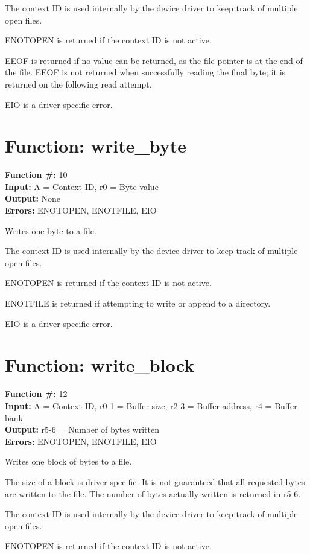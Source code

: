 The context ID is used internally by the device driver to keep
track of multiple open files.

ENOTOPEN is returned if the context ID is not active.

EEOF is returned if no value can be returned, as the file
pointer is at the end of the file. EEOF is not returned when
successfully reading the final byte; it is returned on
the following read attempt.

EIO is a driver-specific error.


\section{Function: write\_byte}

\textbf{Function \#:} 10 \\
\textbf{Input:} A = Context ID, r0 = Byte value \\
\textbf{Output:} None \\
\textbf{Errors:} ENOTOPEN, ENOTFILE, EIO

Writes one byte to a file.

The context ID is used internally by the device driver to keep
track of multiple open files.

ENOTOPEN is returned if the context ID is not active.

ENOTFILE is returned if attempting to write or append
to a directory.

EIO is a driver-specific error.


\section{Function: write\_block}

\textbf{Function \#:} 12 \\
\textbf{Input:} A = Context ID, r0-1 = Buffer size, r2-3 = Buffer address, r4 = Buffer bank \\
\textbf{Output:} r5-6 = Number of bytes written \\
\textbf{Errors:} ENOTOPEN, ENOTFILE, EIO

Writes one block of bytes to a file.

The size of a block is driver-specific. It is not guaranteed that all requested
bytes are written to the file. The number of bytes actually written is returned in r5-6.

The context ID is used internally by the device driver to keep
track of multiple open files.

ENOTOPEN is returned if the context ID is not active.

